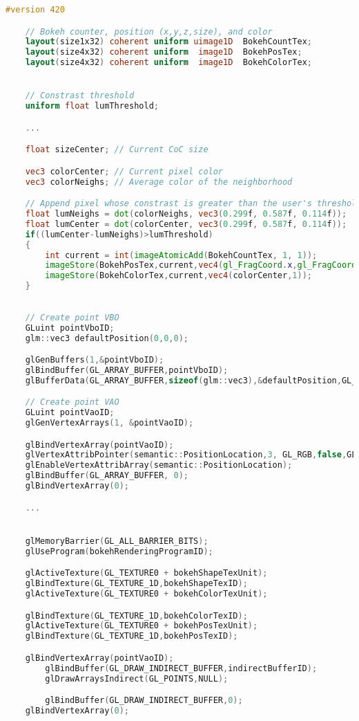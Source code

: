 \begin{lstlisting}[language=GLSL,float={htb},caption={Fragment shader for extracting bokehs.},label={YourName:listing1}]
	#version 420

	// Bokeh counter, position (x,y,z,size), and color
	layout(size1x32) coherent uniform uimage1D 	BokehCountTex;
	layout(size4x32) coherent uniform  image1D 	BokehPosTex;
	layout(size4x32) coherent uniform  image1D 	BokehColorTex;


	// Constrast threshold
	uniform float lumThreshold;

	...

	float sizeCenter; // Current CoC size

	vec3 colorCenter; // Current pixel color
	vec3 colorNeighs; // Average color of the neighborhood

	// Append pixel whose constrast is greater than the user's threshold
	float lumNeighs = dot(colorNeighs, vec3(0.299f, 0.587f, 0.114f));
	float lumCenter = dot(colorCenter, vec3(0.299f, 0.587f, 0.114f));
	if((lumCenter-lumNeighs)>lumThreshold)
	{
		int current = int(imageAtomicAdd(BokehCountTex, 1, 1));
		imageStore(BokehPosTex,current,vec4(gl_FragCoord.x,gl_FragCoord.y,gl_FragCoord.z,sizeCenter));
		imageStore(BokehColorTex,current,vec4(colorCenter,1));
	}
\end{lstlisting}




\begin{lstlisting}[language=C++,float={htb},caption={Your caption.},label={YourName:listing1}]

	// Create point VBO
	GLuint pointVboID;
	glm::vec3 defaultPosition(0,0,0);

	glGenBuffers(1,&pointVboID);
	glBindBuffer(GL_ARRAY_BUFFER,pointVboID);
	glBufferData(GL_ARRAY_BUFFER,sizeof(glm::vec3),&defaultPosition,GL_STATIC_DRAW);

	// Create point VAO
	GLuint pointVaoID;
	glGenVertexArrays(1, &pointVaoID);

	glBindVertexArray(pointVaoID);
	glVertexAttribPointer(semantic::PositionLocation,3, GL_RGB,false,GL_FLOAT,GLF_BUFFER_OFFSET(_offset));
	glEnableVertexAttribArray(semantic::PositionLocation);
	glBindBuffer(GL_ARRAY_BUFFER, 0);
	glBindVertexArray(0);

	...


	glMemoryBarrier(GL_ALL_BARRIER_BITS);
	glUseProgram(bokehRenderingProgramID);

	glActiveTexture(GL_TEXTURE0 + bokehShapeTexUnit);
	glBindTexture(GL_TEXTURE_1D,bokehShapeTexID);
	glActiveTexture(GL_TEXTURE0 + bokehColorTexUnit);

	glBindTexture(GL_TEXTURE_1D,bokehColorTexID);
	glActiveTexture(GL_TEXTURE0 + bokehPosTexUnit);
	glBindTexture(GL_TEXTURE_1D,bokehPosTexID);

	glBindVertexArray(pointVaoID);
		glBindBuffer(GL_DRAW_INDIRECT_BUFFER,indirectBufferID);
		glDrawArraysIndirect(GL_POINTS,NULL);

		glBindBuffer(GL_DRAW_INDIRECT_BUFFER,0);
	glBindVertexArray(0);

\end{lstlisting}


